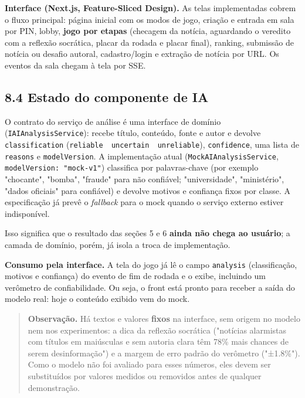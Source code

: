 \documentclass[
  brazilian,
  11pt,
]{article}
\begin{document}
\textbf{Interface (Next.js, Feature-Sliced Design).} As telas implementadas cobrem o fluxo principal: página inicial com os modos de jogo, criação e entrada em sala por PIN, lobby, \textbf{jogo por etapas} (checagem da notícia, aguardando o veredito com a reflexão socrática, placar da rodada e placar final), ranking, submissão de notícia ou desafio autoral, cadastro/login e extração de notícia por URL. Os eventos da sala chegam à tela por SSE.

\subsection{8.4 Estado do componente de IA}\label{estado-do-componente-de-ia}

O contrato do serviço de análise é uma interface de domínio (\texttt{IAIAnalysisService}): recebe título, conteúdo, fonte e autor e devolve \texttt{classification} (\texttt{reliable\ \textbar{}\ uncertain\ \textbar{}\ unreliable}), \texttt{confidence}, uma lista de \texttt{reasons} e \texttt{modelVersion}. A implementação atual (\texttt{MockAIAnalysisService}, \texttt{modelVersion:\ "mock-v1"}) classifica por palavras-chave (por exemplo "chocante", "bomba", "fraude" para não confiável; "universidade", "ministério", "dados oficiais" para confiável) e devolve motivos e confiança fixos por classe. A especificação já prevê o \emph{fallback} para o mock quando o serviço externo estiver indisponível.

Isso significa que o resultado das seções 5 e 6 \textbf{ainda não chega ao usuário}; a camada de domínio, porém, já isola a troca de implementação.

\textbf{Consumo pela interface.} A tela do jogo já lê o campo \texttt{analysis} (classificação, motivos e confiança) do evento de fim de rodada e o exibe, incluindo um verômetro de confiabilidade. Ou seja, o front está pronto para receber a saída do modelo real: hoje o conteúdo exibido vem do mock.

\begin{quote}
\textbf{Observação.} Há textos e valores \textbf{fixos} na interface, sem origem no modelo nem nos experimentos: a dica da reflexão socrática ("notícias alarmistas com títulos em maiúsculas e sem autoria clara têm 78\% mais chances de serem desinformação") e a margem de erro padrão do verômetro ("±1.8\%"). Como o modelo não foi avaliado para esses números, eles devem ser substituídos por valores medidos ou removidos antes de qualquer demonstração.
\end{quote}
\end{document}
